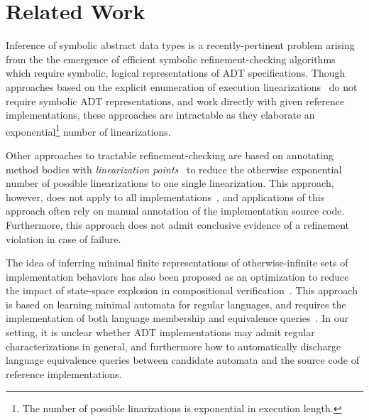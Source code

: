 \section{Related Work}
\label{sec:related}

Inference of symbolic abstract data types is a recently-pertinent problem
arising from the the emergence of efficient symbolic refinement-checking
algorithms~\cite{conf/popl/BouajjaniEEH15, conf/pldi/EmmiEH15} which require
symbolic, logical representations of ADT specifications. Though approaches
based on the explicit enumeration of execution
linearizations~\cite{journals/jpdc/WingG93, conf/pldi/BurckhardtDMT10,
conf/asplos/BurnimNS11, conf/kbse/ZhangCW13} do not require symbolic ADT
representations, and work directly with given reference implementations, these
approaches are intractable as they elaborate an exponential\footnote{The number
of possible linarizations is exponential in execution length.} number of
linearizations.

Other approaches to tractable refinement-checking are based on annotating
method bodies with \emph{linearization
points}~\cite{journals/toplas/HerlihyW90, conf/cav/AmitRRSY07,
conf/fm/LiuCLS09, conf/cav/Vafeiadis10, conf/podc/OHearnRVYY10,
conf/icse/Zhang11a, conf/oopsla/ShachamBASVY11, conf/cav/DragoiGH13,
conf/pldi/LiangF13} to reduce the otherwise exponential number of possible
linearizations to one single linearization. This approach, however, does not
apply to all implementations~\cite{journals/toplas/HerlihyW90}, and
applications of this approach often rely on manual annotation of the
implementation source code. Furthermore, this approach does not admit
conclusive evidence of a refinement violation in case of failure.

The idea of inferring minimal finite representations of otherwise-infinite sets
of implementation behaviors has also been proposed as an optimization to reduce
the impact of state-space explosion in compositional
verification~\cite{journals/ase/GiannakopoulouPB05}. This approach is based on
learning minimal automata for regular languages, and requires the
implementation of both language membership and equivalence
queries~\cite{journals/iandc/Angluin87}. In our setting, it is unclear whether
ADT implementations may admit regular characterizations in general, and
furthermore how to automatically discharge language equivalence queries between
candidate automata and the source code of reference implementations.

